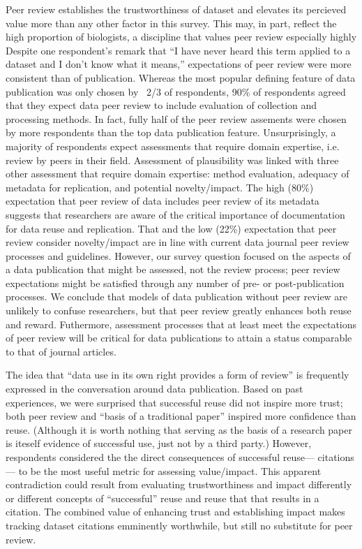 \documentclass[10pt]{article}
\begin{document}
Peer review establishes the trustworthiness of dataset and elevates its percieved value more than any other factor in this survey.
This may, in part, reflect the high proportion of biologists, a discipline that values peer review especially highly\cite{harley_assessing_2010} %
Despite one respondent's remark that ``I have never heard this term applied to a dataset and I don't know what it means,'' expectations of peer review were more consistent than of publication. 
Whereas the most popular defining feature of data publication was only chosen by ~2/3 of respondents, 90\% of respondents agreed that they expect data peer review to include evaluation of collection and processing methods.
In fact, fully half of the peer review assements were chosen by more respondents than the top data publication feature.
Unsurprisingly, a majority of respondents expect assessments that require domain expertise, i.e. review by peers in their field.
Assessment of plausibility was linked with three other assessment that require domain expertise: method evaluation, adequacy of metadata for replication, and potential novelty/impact.
The high (80\%) expectation that peer review of data includes peer review of its metadata suggests that researchers are aware of the critical importance of documentation for data reuse and replication.
That and the low (22\%) expectation that peer review consider novelty/impact are in line with current data journal peer review processes and guidelines\cite{kratz_data_2014}.
However, our survey question focused on the aspects of a data publication that might be assessed, not the review process; peer review expectations might be satisfied through any number of pre- or post-publication processes.
We conclude that models of data publication without peer review are unlikely to confuse researchers, but that peer review greatly enhances both reuse and reward.
Futhermore, assessment processes that at least meet the expectations of peer review will be critical for data publications to attain a status comparable to that of journal articles.

The idea that ``data use in its own right provides a form of review''\cite{parsons_data_2010} is frequently expressed in the conversation around data publication. 
Based on past experiences, we were surprised that successful reuse did not inspire more trust; both peer review and ``basis of a traditional paper'' inspired more confidence than reuse.
(Although it is worth nothing that serving as the basis of a research paper is iteself evidence of successful use, just not by a third party.)
However, respondents considered the the direct consequences of successful reuse--- citations--- to be the most useful metric for assessing value/impact.
This apparent contradiction could result from evaluating trustworthiness and impact differently or different concepts of  ``successful'' reuse and reuse that that results in a citation.
The combined value of enhancing trust and establishing impact makes tracking dataset citations emminently worthwhile, but still no substitute for peer review.
\end{document}
